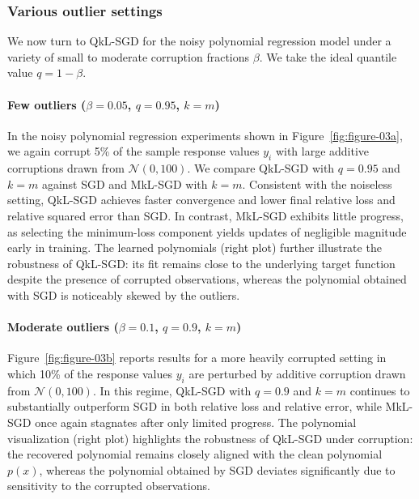 \documentclass[11pt]{article}
\begin{document}
\subsubsection{Various outlier settings}

We now turn to QkL-SGD for the noisy polynomial regression model under a variety of small to moderate corruption fractions $\beta$.  We take the ideal quantile value $q = 1 - \beta$.

\paragraph{Few outliers (\texorpdfstring{$\beta = 0.05$, $q = 0.95$, $k = m$}{beta = 0.05, q = 0.95, k = m})}

In the noisy polynomial regression experiments shown in Figure~\ref{fig:figure-03a}, we again corrupt 5\% of the sample response values $y_i$ with large additive corruptions drawn from $\mathcal{N}(0,100)$. We compare QkL-SGD with $q = 0.95$ and $k = m$ against SGD and MkL-SGD with $k = m$. Consistent with the noiseless setting, QkL-SGD achieves faster convergence and lower final relative loss
and relative squared error
than SGD. In contrast, MkL-SGD exhibits little progress, as selecting the minimum-loss component yields updates of negligible magnitude early in training. The learned polynomials (right plot) further illustrate the robustness of QkL-SGD: its fit remains close to the underlying target function despite the presence of corrupted observations, whereas the polynomial obtained with SGD is noticeably skewed by the outliers.


\paragraph{Moderate outliers (\texorpdfstring{$\beta = 0.1$, $q = 0.9$, $k = m$}{beta = 0.1, q = 0.9, k = m})}

Figure~\ref{fig:figure-03b} reports results for a more heavily corrupted setting in which 10\% of the response values $y_i$ are perturbed by additive corruption drawn from $\mathcal{N}(0,100)$. In this regime, QkL-SGD with $q = 0.9$ and $k = m$ continues to substantially outperform SGD in both relative loss
and relative error,
while MkL-SGD once again stagnates after only limited progress. The polynomial visualization (right plot) highlights the robustness of QkL-SGD under corruption: the recovered polynomial remains closely aligned with the clean polynomial $p(x)$, whereas the polynomial obtained by SGD deviates significantly due to sensitivity to the corrupted observations.
\end{document}
